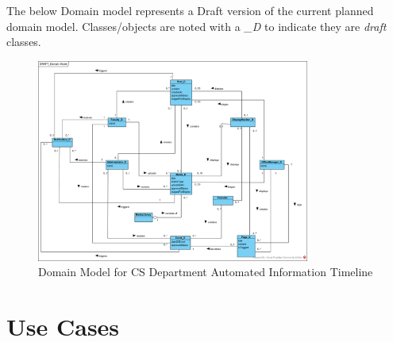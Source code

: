 \documentclass{article}
\begin{document}
The below Domain model represents a Draft version of the current planned domain model.  Classes/objects are noted with a \textit{\_D} to indicate they are \textit{draft} classes.

\begin{figure}[H]
    \centering
    \includegraphics[width=0.8\textwidth]{images/DomainModel.png}
    \centering
    \caption{Domain Model for CS Department Automated Information Timeline}
\end{figure}
\section{Use Cases}
\end{document}
